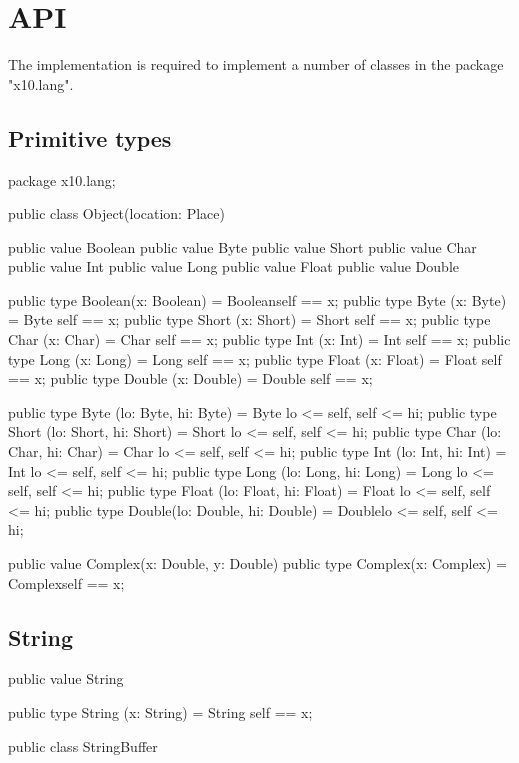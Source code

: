 \chapter{API}\label{XtenAPI}

The \Xten{} implementation is required to implement a number of
classes in the package \xcd"x10.lang".

\section{Primitive types}

\begin{xten}
package x10.lang;

public class Object(location: Place) { }

public value Boolean { }
public value Byte    { }
public value Short   { }
public value Char    { }
public value Int     { }
public value Long    { }
public value Float   { }
public value Double  { }

public type Boolean(x: Boolean) = Boolean{self == x};
public type Byte   (x: Byte)    = Byte   {self == x};
public type Short  (x: Short)   = Short  {self == x};
public type Char   (x: Char)    = Char   {self == x};
public type Int    (x: Int)     = Int    {self == x};
public type Long   (x: Long)    = Long   {self == x};
public type Float  (x: Float)   = Float  {self == x};
public type Double (x: Double)  = Double {self == x};

public type Byte  (lo: Byte,   hi: Byte)   = Byte  {lo <= self, self <= hi};
public type Short (lo: Short,  hi: Short)  = Short {lo <= self, self <= hi};
public type Char  (lo: Char,   hi: Char)   = Char  {lo <= self, self <= hi};
public type Int   (lo: Int,    hi: Int)    = Int   {lo <= self, self <= hi};
public type Long  (lo: Long,   hi: Long)   = Long  {lo <= self, self <= hi};
public type Float (lo: Float,  hi: Float)  = Float {lo <= self, self <= hi};
public type Double(lo: Double, hi: Double) = Double{lo <= self, self <= hi};

public value Complex(x: Double, y: Double) { }
public type Complex(x: Complex) = Complex{self == x};
\end{xten}

\section{String}

\begin{xten}
public value String  { }

public type String (x: String)  = String {self == x};

public class StringBuffer { }
\end{xten}

